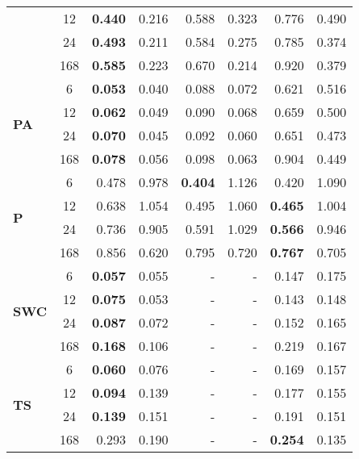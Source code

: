 \begin{table}
\begin{tabular}{p{2.1cm}c|rr|rr|rr}
 & 12 & \bfseries 0.440 & 0.216 & 0.588 & 0.323 & 0.776 & 0.490 \\
 & 24 & \bfseries 0.493 & 0.211 & 0.584 & 0.275 & 0.785 & 0.374 \\
 & 168 & \bfseries 0.585 & 0.223 & 0.670 & 0.214 & 0.920 & 0.379 \\
\cline{1-8}
\multirow[c]{4}{*}{\parbox{2.1cm}{\textbf{PA}}} & 6 & \bfseries 0.053 & 0.040 & 0.088 & 0.072 & 0.621 & 0.516 \\
 & 12 & \bfseries 0.062 & 0.049 & 0.090 & 0.068 & 0.659 & 0.500 \\
 & 24 & \bfseries 0.070 & 0.045 & 0.092 & 0.060 & 0.651 & 0.473 \\
 & 168 & \bfseries 0.078 & 0.056 & 0.098 & 0.063 & 0.904 & 0.449 \\
\cline{1-8}
\multirow[c]{4}{*}{\parbox{2.1cm}{\textbf{P}}} & 6 & 0.478 & 0.978 & \bfseries 0.404 & 1.126 & 0.420 & 1.090 \\
 & 12 & 0.638 & 1.054 & 0.495 & 1.060 & \bfseries 0.465 & 1.004 \\
 & 24 & 0.736 & 0.905 & 0.591 & 1.029 & \bfseries 0.566 & 0.946 \\
 & 168 & 0.856 & 0.620 & 0.795 & 0.720 & \bfseries 0.767 & 0.705 \\
\cline{1-8}
\multirow[c]{4}{*}{\parbox{2.1cm}{\textbf{SWC}}} & 6 & \bfseries 0.057 & 0.055 & - & - & 0.147 & 0.175 \\
 & 12 & \bfseries 0.075 & 0.053 & - & - & 0.143 & 0.148 \\
 & 24 & \bfseries 0.087 & 0.072 & - & - & 0.152 & 0.165 \\
 & 168 & \bfseries 0.168 & 0.106 & - & - & 0.219 & 0.167 \\
\cline{1-8}
\multirow[c]{4}{*}{\parbox{2.1cm}{\textbf{TS}}} & 6 & \bfseries 0.060 & 0.076 & - & - & 0.169 & 0.157 \\
 & 12 & \bfseries 0.094 & 0.139 & - & - & 0.177 & 0.155 \\
 & 24 & \bfseries 0.139 & 0.151 & - & - & 0.191 & 0.151 \\
 & 168 & 0.293 & 0.190 & - & - & \bfseries 0.254 & 0.135 \\
\cline{1-8}
\bottomrule
\end{tabular}
\end{table}
